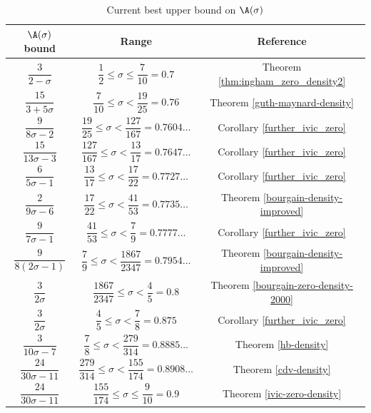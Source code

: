 \begin{table}[ht]
    \def\arraystretch{2}
    \centering
    \caption{Current best upper bound on $\A(\sigma)$}
    \begin{tabular}{|c|c|c|}
    \hline
    $\A(\sigma)$ bound & Range & Reference\\
    \hline
    $\dfrac{3}{2 - \sigma}$ & $\dfrac{1}{2} \leq \sigma \le \dfrac{7}{10} = 0.7$ & Theorem \ref{thm:ingham_zero_density2}\\
    \hline
    $\dfrac{15}{3+5\sigma}$ & $\dfrac{7}{10} \leq \sigma < \dfrac{19}{25} = 0.76$ & Theorem \ref{guth-maynard-density}\\
    \hline
    $\dfrac{9}{8\sigma - 2}$ & $\dfrac{19}{25} \leq \sigma < \dfrac{127}{167} = 0.7604\ldots$ & Corollary \ref{further_ivic_zero}\\
    \hline
    $\dfrac{15}{13\sigma - 3}$ & $\dfrac{127}{167} \leq \sigma < \dfrac{13}{17} = 0.7647\ldots$ & Corollary \ref{further_ivic_zero}\\
    \hline
    $\dfrac{6}{5\sigma - 1}$ & $\dfrac{13}{17} \leq \sigma < \dfrac{17}{22} = 0.7727\ldots$ & Corollary \ref{further_ivic_zero}\\
    \hline
    $\dfrac{2}{9\sigma - 6}$ & $\dfrac{17}{22} \leq \sigma < \dfrac{41}{53} = 0.7735\ldots$ & Theorem \ref{bourgain-density-improved}\\
    \hline
    $\dfrac{9}{7\sigma - 1}$ & $\dfrac{41}{53} \leq \sigma < \dfrac{7}{9} = 0.7777\ldots$ & Corollary \ref{further_ivic_zero}\\
    \hline
    $\dfrac{9}{8(2\sigma-1)}$ & $\dfrac{7}{9} \le \sigma < \dfrac{1867}{2347} = 0.7954\ldots$ & Theorem \ref{bourgain-density-improved} \\
    \hline
    $\dfrac{3}{2\sigma}$ & $\dfrac{1867}{2347} \le \sigma < \dfrac{4}{5} = 0.8$ & Theorem \ref{bourgain-zero-density-2000} \\
    \hline
    $\dfrac{3}{2\sigma}$ & $\dfrac{4}{5} \le \sigma < \dfrac{7}{8} = 0.875$ & Corollary \ref{further_ivic_zero} \\
    \hline
    $\dfrac{3}{10\sigma - 7}$ & $\dfrac{7}{8} \le \sigma < \dfrac{279}{314} = 0.8885\ldots$ & Theorem \ref{hb-density}\\
    \hline
    $\dfrac{24}{30\sigma - 11}$ & $\dfrac{279}{314} \le \sigma < \dfrac{155}{174} = 0.8908\ldots$ & Theorem \ref{cdv-density}  \\
    \hline
    $\dfrac{24}{30\sigma - 11}$& $\dfrac{155}{174} \le \sigma \le \dfrac{9}{10} = 0.9$ & Theorem \ref{ivic-zero-density}\\

\end{tabular}
\end{table}
